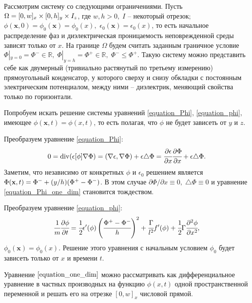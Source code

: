 \documentclass[a4paper,12pt]{article}
\DeclareMathOperator{\Div}{div}
\newcommand*{\hm}[1]{#1\nobreak\discretionary{}
{\hbox{$\mathsurround=0pt #1$}}{}}
\theoremstyle{plain}
\theoremstyle{definition}
\begin{document}
Рассмотрим систему со следующими ограничениями. Пусть $\Omega = [0, w]_x \times [0, h]_y \hm \times I_z$, где $w, h > 0, \; I$ -- некоторый отрезок; $\phi(\mathbf{x}, 0) = \phi_0(\mathbf{x}) = \phi_0(x),$ $\epsilon_0(\mathbf{x}) = \epsilon_0(x)$, то есть начальное распределение фаз и диэлектрическая проницаемость неповрежденной среды зависят только от $x$. На границе $\Omega$ будем считать заданным граничное условие $\Phi|_{y = 0} = \Phi^- \in \mathbb{R}, \; \Phi|_{y = h} = \Phi^+ \in \mathbb{R}, \; \Phi^- \leqslant \Phi^+$. Такую систему можно представить себе как двумерный (тривиально растянутый по третьему измерению) прямоугольный конденсатор, у которого сверху и снизу обкладки с постоянным электрическим потенциалом, между ними -- диэлектрик, меняющий свойства только по горизонтали.

Попробуем искать решение системы уравнений \eqref{equation_Phi}, \eqref{equation_phi}, имеющее $\phi(\mathbf{x}, t) = \phi(x, t)$, то есть полагая, что $\phi$ не будет зависеть от $y$ и $z$.

Преобразуем уравнение \eqref{equation_Phi}:
\begin{equation}
    0 = \Div(\epsilon[\phi] \nabla \Phi) = (\nabla \epsilon, \nabla \Phi) + \epsilon \triangle \Phi = \cfrac{\partial \epsilon}{\partial x} \cfrac{\partial \Phi}{\partial x} + \epsilon \triangle \Phi \text{.}
    \label{equation_Phi_one_dim}
\end{equation}
Заметим, что независимо от конкретных $\phi$ и $\epsilon_0$ решением является $\Phi(\mathbf{x}, t) = \Phi^- \hm + (y/h)(\Phi^+ - \Phi^-)$. В этом случае $\partial \Phi/\partial x \equiv 0, \; \triangle \Phi \equiv 0$ и уравнение \eqref{equation_Phi_one_dim} становится тождеством.

Преобразуем уравнение \eqref{equation_phi}:
\begin{equation}
    \cfrac{1}{m} \cfrac{\partial \phi}{\partial t} = \cfrac{1}{2} \epsilon'(\phi) \left( \cfrac{\Phi^+ - \Phi^-}{h} \right)^2 + \cfrac{\Gamma}{l^2} f'(\phi) + \cfrac{1}{2} \Gamma \cfrac{\partial^2 \phi}{\partial x^2} \text{,}
    \label{equation_one_dim}
\end{equation}
$\phi_0(\mathbf{x}) = \phi_0(x)$. Решение этого уравнения с начальным условием $\phi_0$ будет зависеть только от $x$ и времени $t$.

Уравнение $\eqref{equation_one_dim}$ можно рассматривать как дифференциальное уравнение в частных производных на функцию $\phi(x, t)$ одной пространственной переменной и решать его на отрезке $[0, w]_x$ числовой прямой.
\end{document}
